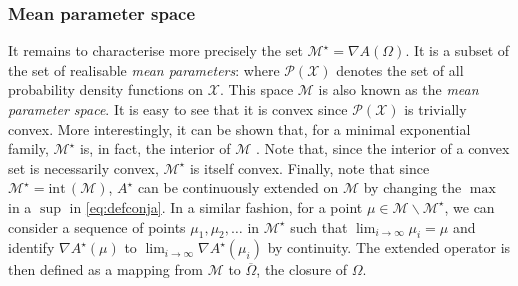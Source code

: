 \subsubsection*{Mean parameter space}
It remains to characterise more precisely the set $\mathcal M^{\star}=\nabla A(\Omega)$. It is a subset of the set of realisable \emph{mean parameters}:
%
%
where $\mathcal P(\mathcal X)$ denotes the set of all probability density functions on $\mathcal X$. This space $\mathcal M$ is also known as the \emph{mean parameter space}. It is easy to see that it is convex since $\mathcal P(\mathcal X)$ is trivially convex. More interestingly, it can be shown that, for a minimal exponential family, $\mathcal M^{\star}$ is, in fact, the interior of $\mathcal M$ \citep[theorem 3.3]{wainwright08}. Note that, since the interior of a convex set is necessarily convex, $\mathcal M^{\star}$ is itself convex. Finally, note that since $\mathcal M^{\star}=\mathrm{int}\,(\mathcal M)$, $A^{\star}$ can be continuously extended on $\mathcal M$ by changing the $\max$ in a $\sup$ in \eqref{eq:defconja}. In a similar fashion, for a point $\mu\in\mathcal M\backslash \mathcal M^{\star}$, we can consider a sequence of points $\mu_{1},\mu_{2},\dots$ in $\mathcal M^{\star}$ such that $\lim_{i\to\infty}\mu_{i}=\mu$ and identify $\nabla A^{\star}(\mu)$ to $\lim_{i\to\infty}\nabla A^{\star}(\mu_{i})$ by continuity. The extended operator is then defined as a mapping from $\mathcal M$ to $\overline\Omega$, the closure of $\Omega$. 

%
